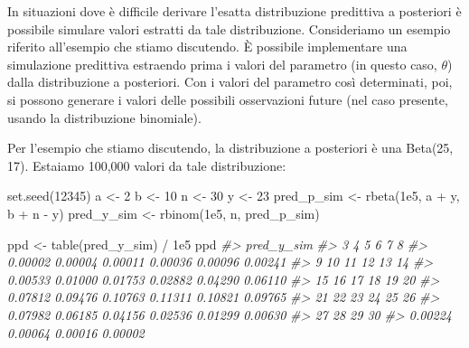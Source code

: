 \documentclass[
  11pt,
]{krantz}
\makeatletter
\newenvironment{Shaded}{\begin{snugshade}}{\end{snugshade}}
\newcommand{\CommentTok}[1]{\textcolor[rgb]{0.37,0.37,0.37}{\textit{#1}}}
\newcommand{\DecValTok}[1]{\textcolor[rgb]{0.06,0.06,0.06}{#1}}
\newcommand{\FloatTok}[1]{\textcolor[rgb]{0.06,0.06,0.06}{#1}}
\newcommand{\FunctionTok}[1]{\textcolor[rgb]{0,0,0}{#1}}
\newcommand{\NormalTok}[1]{#1}
\newcommand{\OtherTok}[1]{\textcolor[rgb]{0.37,0.37,0.37}{#1}}
\newcommand{\SpecialCharTok}[1]{\textcolor[rgb]{0,0,0}{#1}}
\newenvironment{kframe}{%
\medskip{}
\setlength{\fboxsep}{.8em}
 \def\at@end@of@kframe{}%
 \ifinner\ifhmode%
  \def\at@end@of@kframe{\end{minipage}}%
  \begin{minipage}{\columnwidth}%
 \fi\fi%
 \def\FrameCommand##1{\hskip\@totalleftmargin \hskip-\fboxsep
 \colorbox{shadecolor}{##1}\hskip-\fboxsep
     \hskip-\linewidth \hskip-\@totalleftmargin \hskip\columnwidth}%
 \MakeFramed {\advance\hsize-\width
   \@totalleftmargin\z@ \linewidth\hsize
   \@setminipage}}%
 {\par\unskip\endMakeFramed%
 \at@end@of@kframe}
\renewenvironment{Shaded}{\begin{kframe}}{\end{kframe}}
\theoremstyle{definition}
\theoremstyle{definition}
\theoremstyle{definition}
\theoremstyle{definition}
\theoremstyle{remark}
\makeatother
\begin{document}
In situazioni dove è difficile derivare l'esatta distribuzione predittiva a posteriori è possibile simulare valori estratti da tale distribuzione. Consideriamo un esempio riferito all'esempio che stiamo discutendo. È possibile implementare una simulazione predittiva estraendo prima i valori del parametro (in questo caso, \(\theta\)) dalla distribuzione a posteriori. Con i valori del parametro così determinati, poi, si possono generare i valori delle possibili osservazioni future (nel caso presente, usando la distribuzione binomiale).

Per l'esempio che stiamo discutendo, la distribuzione a posteriori è una Beta(25, 17). Estaiamo 100,000 valori da tale distribuzione:

\begin{Shaded}
\begin{Highlighting}[]
\FunctionTok{set.seed}\NormalTok{(}\DecValTok{12345}\NormalTok{)}
\NormalTok{a }\OtherTok{\textless{}{-}} \DecValTok{2}
\NormalTok{b }\OtherTok{\textless{}{-}} \DecValTok{10}
\NormalTok{n }\OtherTok{\textless{}{-}} \DecValTok{30}
\NormalTok{y }\OtherTok{\textless{}{-}} \DecValTok{23}
\NormalTok{pred\_p\_sim }\OtherTok{\textless{}{-}} \FunctionTok{rbeta}\NormalTok{(}\FloatTok{1e5}\NormalTok{, a }\SpecialCharTok{+}\NormalTok{ y, b }\SpecialCharTok{+}\NormalTok{ n }\SpecialCharTok{{-}}\NormalTok{ y)}
\NormalTok{pred\_y\_sim }\OtherTok{\textless{}{-}} \FunctionTok{rbinom}\NormalTok{(}\FloatTok{1e5}\NormalTok{, n, pred\_p\_sim)}
\end{Highlighting}
\end{Shaded}

\begin{Shaded}
\begin{Highlighting}[]
\NormalTok{ppd }\OtherTok{\textless{}{-}} \FunctionTok{table}\NormalTok{(pred\_y\_sim) }\SpecialCharTok{/} \FloatTok{1e5}
\NormalTok{ppd}
\CommentTok{\#\textgreater{} pred\_y\_sim}
\CommentTok{\#\textgreater{}       3       4       5       6       7       8 }
\CommentTok{\#\textgreater{} 0.00002 0.00004 0.00011 0.00036 0.00096 0.00241 }
\CommentTok{\#\textgreater{}       9      10      11      12      13      14 }
\CommentTok{\#\textgreater{} 0.00533 0.01000 0.01753 0.02882 0.04290 0.06110 }
\CommentTok{\#\textgreater{}      15      16      17      18      19      20 }
\CommentTok{\#\textgreater{} 0.07812 0.09476 0.10763 0.11311 0.10821 0.09765 }
\CommentTok{\#\textgreater{}      21      22      23      24      25      26 }
\CommentTok{\#\textgreater{} 0.07982 0.06185 0.04156 0.02536 0.01299 0.00630 }
\CommentTok{\#\textgreater{}      27      28      29      30 }
\CommentTok{\#\textgreater{} 0.00224 0.00064 0.00016 0.00002}
\end{Highlighting}
\end{Shaded}
\end{document}
